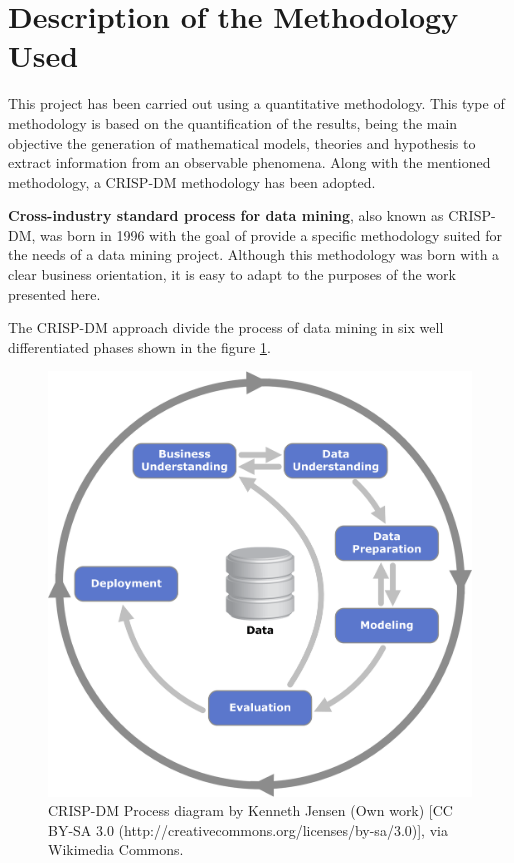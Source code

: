 
\section{Description of the Methodology Used}

This project has been carried out using a quantitative methodology. This type of methodology is based on the quantification of the results, being the main objective the generation of mathematical models, theories and hypothesis to extract information from an observable phenomena.
Along with the mentioned methodology, a CRISP-DM methodology has been adopted.

\textbf{Cross-industry standard process for data mining}, also known as CRISP-DM, was born in 1996 with the goal of provide a specific methodology suited for the needs of a data mining project. Although this methodology was born with a clear business orientation, it is easy to adapt to the purposes of the work presented here.

The CRISP-DM approach divide the process of data mining in six well differentiated phases shown in the figure \ref{fig:crisp-dm}.

\begin{figure}[h]
    \centering
    \includegraphics[scale=1]{../figs/CRISP-DM_Process_Diagram.png}
    \caption{CRISP-DM Process diagram by Kenneth Jensen (Own work) [CC BY-SA 3.0 (http://creativecommons.org/licenses/by-sa/3.0)], via Wikimedia Commons.}
    \label{fig:crisp-dm}
\end{figure}

